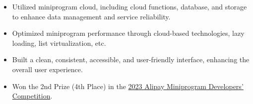 


\begin{itemize}[nosep]
  \item Utilized miniprogram cloud, including cloud functions, database, and storage to enhance data management and service reliability.
  \item Optimized miniprogram performance through cloud-based technologies, lazy loading, list virtualization, etc.
  \item Built a clean, consistent, accessible, and user-friendly interface, enhancing the overall user experience.
  \item Won the 2nd Prize (4th Place) in the \href{https://open.alipay.com/portal/forum/competition/2023}{2023 Alipay Miniprogram Developers' Competition}.
\end{itemize}
